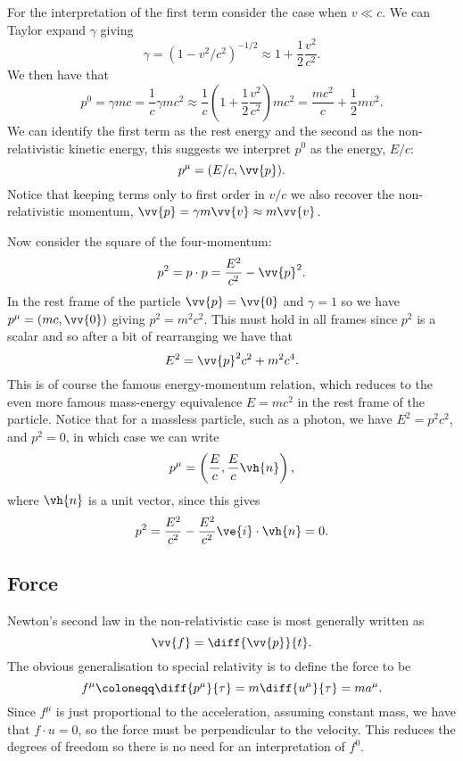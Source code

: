 For the interpretation of the first term consider the case when \(v \ll c\).
We can Taylor expand \(\gamma\) giving
\begin{equation}
    \gamma = (1 - v^2/c^2)^{-1/2} \approx 1 + \frac{1}{2}\frac{v^2}{c^2}.
\end{equation}
We then have that
\begin{equation}
    p^0 = \gamma mc = \frac{1}{c} \gamma mc^2 \approx \frac{1}{c}\left( 1 + \frac{1}{2}\frac{v^2}{c^2} \right)mc^2 = \frac{mc^2}{c} + \frac{1}{2}mv^2.
\end{equation}
We can identify the first term as the rest energy and the second as the non-relativistic kinetic energy, this suggests we interpret \(p^0\) as the energy, \(E/c\):
\begin{equation}
    p^\mu = (E/c, \vv{p}).
\end{equation}
Notice that keeping terms only to first order in \(v/c\) we also recover the non-relativistic momentum, \(\vv{p} = \gamma m\vv{v} \approx m\vv{v}\).

Now consider the square of the four-momentum:
\begin{equation}
    p^2 = p\cdot p = \frac{E^2}{c^2} - \vv{p}^2.
\end{equation}
In the rest frame of the particle \(\vv{p} = \vv{0}\) and \(\gamma = 1\) so we have \(p^\mu = (mc, \vv{0})\) giving \(p^2 = m^2c^2\).
This must hold in all frames since \(p^2\) is a scalar and so after a bit of rearranging we have that
\begin{equation}
    E^2 = \vv{p}^2c^2 + m^2c^4.
\end{equation}
This is of course the famous energy-momentum relation, which reduces to the even more famous mass-energy equivalence \(E = mc^2\) in the rest frame of the particle.
Notice that for a massless particle, such as a photon, we have \(E^2 = p^2c^2\), and \(p^2 = 0\), in which case we can write
\begin{equation}
    p^\mu = \left( \frac{E}{c}, \frac{E}{c}\vh{n} \right),
\end{equation}
where \(\vh{n}\) is a unit vector, since this gives
\begin{equation}
    p^2 = \frac{E^2}{c^2} - \frac{E^2}{c^2}\ve{i}\cdot\vh{n} = 0.
\end{equation}

\subsection{Force}
Newton's second law in the non-relativistic case is most generally written as
\begin{equation}
    \vv{f} = \diff{\vv{p}}{t}.
\end{equation}
The obvious generalisation to special relativity is to define the force to be
\begin{equation}
    f^\mu \coloneqq \diff{p^\mu}{\tau} = m\diff{u^\mu}{\tau} = ma^\mu.
\end{equation}
Since \(f^\mu\) is just proportional to the acceleration, assuming constant mass, we have that \(f\cdot u = 0\), so the force must be perpendicular to the velocity.
This reduces the degrees of freedom so there is no need for an interpretation of \(f^0\).